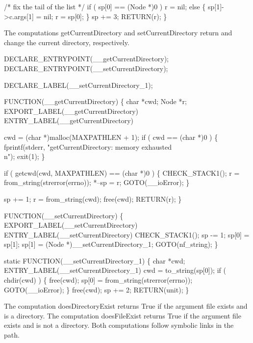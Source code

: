     /* fix the tail of the list */
    if ( sp[0] == (Node *)0 )
        r = nil;
    else
    \{
        sp[1]->c.args[1] = nil;
        r                = sp[0];
    \}
    sp += 3;
    RETURN(r);
\}

\nwendcode{}\nwdocspar
The computations {\Tt{}getCurrentDirectory\nwendquote} and {\Tt{}setCurrentDirectory\nwendquote}
return and change the current directory, respectively.

\nwenddocs{}\plusendmoddef\nwstartdeflinemarkup{}\nwenddeflinemarkup
DECLARE_ENTRYPOINT(__getCurrentDirectory);
DECLARE_ENTRYPOINT(__setCurrentDirectory);

DECLARE_LABEL(__setCurrentDirectory_1);

FUNCTION(__getCurrentDirectory)
\{
    char *cwd;
    Node *r;
    EXPORT_LABEL(__getCurrentDirectory)
 ENTRY_LABEL(__getCurrentDirectory)

    cwd = (char *)malloc(MAXPATHLEN + 1);
    if ( cwd == (char *)0 )
    \{
        fprintf(stderr, "getCurrentDirectory: memory exhausted\\n");
        exit(1);
    \}

    if ( getcwd(cwd, MAXPATHLEN) == (char *)0 )
    \{
        CHECK_STACK1();
        r     = from_string(strerror(errno));
        *--sp = r;
        GOTO(__ioError);
    \}

    sp += 1;
    r   = from_string(cwd);
    free(cwd);
    RETURN(r);
\}

FUNCTION(__setCurrentDirectory)
\{
    EXPORT_LABEL(__setCurrentDirectory)
 ENTRY_LABEL(__setCurrentDirectory)
    CHECK_STACK1();
    sp   -= 1;
    sp[0] = sp[1];
    sp[1] = (Node *)__setCurrentDirectory_1;
    GOTO(nf_string);
\}

static
FUNCTION(__setCurrentDirectory_1)
\{
    char *cwd;
 ENTRY_LABEL(__setCurrentDirectory_1)
    cwd = to_string(sp[0]);
    if ( chdir(cwd) )
    \{
        free(cwd);
        sp[0] = from_string(strerror(errno));
        GOTO(__ioError);
    \}
    free(cwd);
    sp += 2;
    RETURN(unit);
\}

\nwendcode{}\nwdocspar
The computation {\Tt{}doesDirectoryExist\nwendquote} returns {\Tt{}True\nwendquote} if the
argument file exists and is a directory. The computation
{\Tt{}doesFileExist\nwendquote} returns {\Tt{}True\nwendquote} if the argument file exists and is
not a directory. Both computations follow symbolic links in the path.

